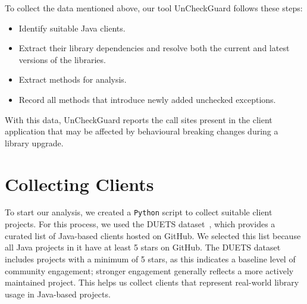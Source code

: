 To collect the data mentioned above, our tool UnCheckGuard follows these steps:
\begin{itemize}
    \item Identify suitable Java clients.
    \item Extract their library dependencies and resolve both the current and latest versions of the libraries.
    \item Extract methods for analysis.
    \item Record all methods that introduce newly added unchecked exceptions.
\end{itemize}
With this data, UnCheckGuard reports the call sites present in the client application that may be affected by behavioural breaking changes during a library upgrade.

\section{Collecting Clients}


To start our analysis, we created a \texttt{Python} script to collect suitable client projects. For this process, we used the DUETS dataset~\cite{durieux21:_duets}, which provides a curated list of Java-based clients hosted on GitHub. We selected this list because all Java projects in it have at least 5 stars on GitHub. The DUETS dataset includes projects with a minimum of 5 stars, as this indicates a baseline level of community engagement; stronger engagement generally reflects a more actively maintained project. This helps us collect clients that represent real-world library usage in Java-based projects.



